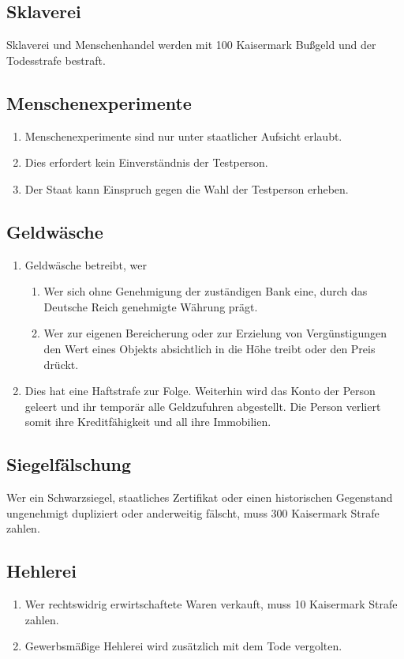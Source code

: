 \documentclass{article}
\begin{document}
\subsection{Sklaverei}
Sklaverei und Menschenhandel werden mit 100 Kaisermark Bußgeld und der Todesstrafe bestraft.

\subsection{Menschenexperimente}
\begin{enumerate}[(1)]
    \item Menschenexperimente sind nur unter staatlicher Aufsicht erlaubt.
    \item Dies erfordert kein Einverständnis der Testperson.
    \item Der Staat kann Einspruch gegen die Wahl der Testperson erheben.
\end{enumerate}

\subsection{Geldwäsche}
\begin{enumerate}[(1)]
    \item Geldwäsche betreibt, wer
    \begin{enumerate}[1.]
        \item Wer sich ohne Genehmigung der zuständigen Bank eine, durch das Deutsche Reich genehmigte Währung prägt.
        \item Wer zur eigenen Bereicherung oder zur Erzielung von Vergünstigungen den Wert eines Objekts absichtlich in die Höhe treibt oder den Preis drückt. 
    \end{enumerate}
    \item Dies hat eine Haftstrafe zur Folge. Weiterhin wird das Konto der Person geleert und ihr temporär alle Geldzufuhren abgestellt. Die Person verliert somit ihre Kreditfähigkeit und all ihre Immobilien.
\end{enumerate}

\subsection{Siegelfälschung}
Wer ein Schwarzsiegel, staatliches Zertifikat oder einen historischen Gegenstand ungenehmigt dupliziert oder anderweitig fälscht, muss 300 Kaisermark Strafe zahlen.

\subsection{Hehlerei}
\begin{enumerate}[(1)]
    \item Wer rechtswidrig erwirtschaftete Waren verkauft, muss 10 Kaisermark Strafe zahlen.
    \item Gewerbsmäßige Hehlerei wird zusätzlich mit dem Tode vergolten.
\end{enumerate}
\end{document}
